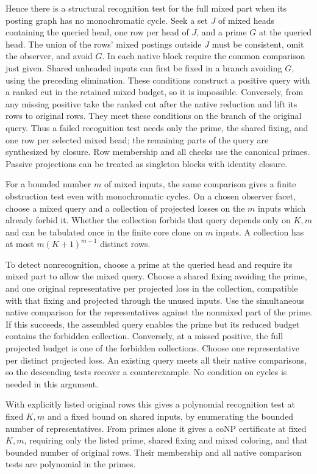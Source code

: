 Hence there is a structural recognition test for
the full mixed part when its posting graph has no
monochromatic cycle. Seek a set $J$ of mixed heads
containing the queried head, one row per head of
$J$, and a prime $G$ at the queried head. The union
of the rows' mixed postings outside $J$ must be
consistent, omit the observer, and avoid $G$.
In each native block require the common comparison
just given. Shared unheaded inputs can first be
fixed in a branch avoiding $G$, using the preceding
elimination. These conditions construct a positive
query with a ranked cut in the retained mixed budget,
so it is impossible. Conversely, from any missing
positive take the ranked cut after the native
reduction and lift its rows to original rows.
They meet these conditions on the branch of the
original query. Thus a failed recognition test
needs only the prime, the shared fixing, and one
row per selected mixed head; the remaining parts
of the query are synthesized by closure. Row
membership and all checks use the canonical primes.
Passive projections can be treated as singleton
blocks with identity closure.

For a bounded number $m$ of mixed inputs, the same
comparison gives a finite obstruction test even with
monochromatic cycles. On a chosen observer facet,
choose a mixed query and a collection of projected
losses on the $m$ inputs which already forbid it.
Whether the collection forbids that query depends
only on $K,m$ and can be tabulated once in the finite
core clone on $m$ inputs. A collection has at most
$m(K+1)^{m-1}$ distinct rows.

To detect nonrecognition, choose a prime at the
queried head and require its mixed part to allow
the mixed query. Choose a shared fixing avoiding
the prime, and one original representative per
projected loss in the collection, compatible with
that fixing and projected through the unused
inputs. Use the simultaneous native comparison
for the representatives against the nonmixed
part of the prime. If this succeeds, the assembled
query enables the prime but its reduced budget
contains the forbidden collection. Conversely,
at a missed positive, the full projected budget
is one of the forbidden collections. Choose one
representative per distinct projected loss. An
existing query meets all their native comparisons,
so the descending tests recover a counterexample.
No condition on cycles is needed in this argument.

With explicitly listed original rows this gives a
polynomial recognition test at fixed $K,m$ and a
fixed bound on shared inputs, by enumerating the
bounded number of representatives. From primes
alone it gives a coNP certificate at fixed $K,m$,
requiring only the listed prime, shared fixing and
mixed coloring, and that bounded number of
original rows. Their membership and all native
comparison tests are polynomial in the primes.

